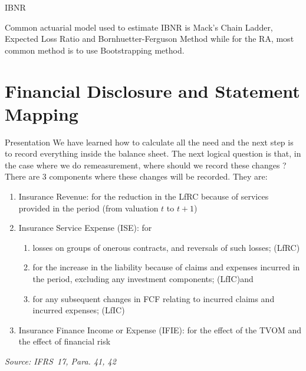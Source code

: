 \documentclass[aspectratio=169]{beamer}
\begin{document}
\begin{frame}{IBNR}
\begin{figure}
\begin{center}
\end{center}
\end{figure} 
  Common actuarial model used to estimate IBNR is Mack's Chain Ladder, Expected Loss Ratio and Bornhuetter-Ferguson Method while for the RA, most common method is to use Bootstrapping method.
\end{frame}

\section{Financial Disclosure and Statement Mapping}

\begin{frame}{Presentation}
We have learned how to calculate all the need and the next step is to record everything inside the balance sheet. The next logical question is that, in the case where we do remeasurement, where should we record these changes ? 
There are 3 components where these changes will be recorded. They are:
\begin{enumerate}
	\item Insurance Revenue: for the reduction in the LfRC because of services provided in the period (from valuation $t$ to $t+1$)
	\item Insurance Service Expense (ISE): for 
	\begin{enumerate}
		\item losses on groups of onerous contracts, and reversals of such losses; (LfRC)
		\item for the increase in the liability because of claims and expenses incurred in the period, excluding any investment components;  (LfIC)and
		\item for any subsequent changes in FCF  relating to incurred claims and incurred expenses; (LfIC)
	\end{enumerate}
	\item Insurance Finance Income or Expense (IFIE): for the effect of the TVOM and the effect of financial risk
\end{enumerate}
\footnotesize
\textit{Source: IFRS~17, Para. 41, 42}\\
\normalsize
\end{frame}
\end{document}
